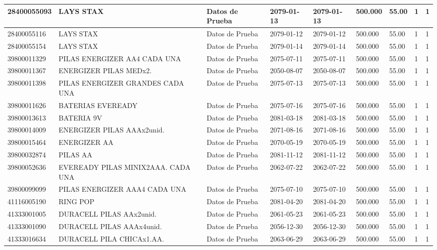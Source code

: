 \documentclass[a4paper,12pt]{article}
\begin{document}
\begin{landscape}
\begin{longtable}{|p{4cm}|p{2.5cm}|p{2.5cm}|p{1.8cm}|p{1.8cm}|p{1cm}|p{1cm}|p{3cm}|p{3cm}||}
28400055093 & LAYS STAX & Datos de Prueba & 2079-01-13 & 2079-01-13 & 500.000 & 55.00 & 1 & 1 \\ \hline 
28400055116 & LAYS STAX & Datos de Prueba & 2079-01-12 & 2079-01-12 & 500.000 & 55.00 & 1 & 1 \\ \hline 
28400055154 & LAYS STAX & Datos de Prueba & 2079-01-14 & 2079-01-14 & 500.000 & 55.00 & 1 & 1 \\ \hline 
39800011329 & PILAS ENERGIZER AA4  CADA  UNA & Datos de Prueba & 2075-07-11 & 2075-07-11 & 500.000 & 55.00 & 1 & 1 \\ \hline 
39800011367 & ENERGIZER PILAS MEDx2. & Datos de Prueba & 2050-08-07 & 2050-08-07 & 500.000 & 55.00 & 1 & 1 \\ \hline 
39800011398 & PILAS ENERGIZER GRANDES CADA UNA & Datos de Prueba & 2075-07-13 & 2075-07-13 & 500.000 & 55.00 & 1 & 1 \\ \hline 
39800011626 & BATERIAS EVEREADY & Datos de Prueba & 2075-07-16 & 2075-07-16 & 500.000 & 55.00 & 1 & 1 \\ \hline 
39800013613 & BATERIA 9V & Datos de Prueba & 2081-03-18 & 2081-03-18 & 500.000 & 55.00 & 1 & 1 \\ \hline 
39800014009 & ENERGIZER PILAS AAAx2unid. & Datos de Prueba & 2071-08-16 & 2071-08-16 & 500.000 & 55.00 & 1 & 1 \\ \hline 
39800015464 & ENERGIZER AA & Datos de Prueba & 2070-05-19 & 2070-05-19 & 500.000 & 55.00 & 1 & 1 \\ \hline 
39800032874 & PILAS AA & Datos de Prueba & 2081-11-12 & 2081-11-12 & 500.000 & 55.00 & 1 & 1 \\ \hline 
39800052636 & EVEREADY PILAS MINIX2AAA.  CADA UNA & Datos de Prueba & 2062-07-22 & 2062-07-22 & 500.000 & 55.00 & 1 & 1 \\ \hline 
39800099099 & PILAS ENERGIZER AAA4   CADA UNA & Datos de Prueba & 2075-07-10 & 2075-07-10 & 500.000 & 55.00 & 1 & 1 \\ \hline 
41116005190 & RING POP & Datos de Prueba & 2081-04-20 & 2081-04-20 & 500.000 & 55.00 & 1 & 1 \\ \hline 
41333001005 & DURACELL PILAS AAx2unid. & Datos de Prueba & 2061-05-23 & 2061-05-23 & 500.000 & 55.00 & 1 & 1 \\ \hline 
41333001090 & DURACELL PILAS AAAx4unid. & Datos de Prueba & 2056-12-30 & 2056-12-30 & 500.000 & 55.00 & 1 & 1 \\ \hline 
41333016634 & DURACELL PILA CHICAx1.AA. & Datos de Prueba & 2063-06-29 & 2063-06-29 & 500.000 & 55.00 & 1 & 1 \\ \hline 

\end{longtable}
\end{landscape}
\end{document}
